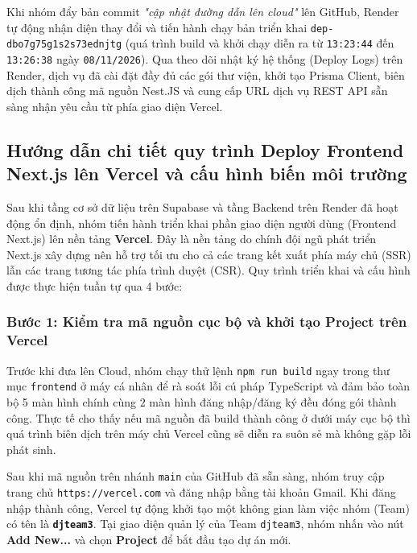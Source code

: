 Khi nhóm đẩy bản commit \textit{"cập nhật đường dẫn lên cloud"} lên GitHub, Render tự động nhận diện thay đổi và tiến hành chạy bản triển khai \texttt{dep-dbo7g75g1s2s73ednjtg} (quá trình build và khởi chạy diễn ra từ \texttt{13:23:44} đến \texttt{13:26:38} ngày \texttt{08/11/2026}). Qua theo dõi nhật ký hệ thống (Deploy Logs) trên Render, dịch vụ đã cài đặt đầy đủ các gói thư viện, khởi tạo Prisma Client, biên dịch thành công mã nguồn Nest.JS và cung cấp URL dịch vụ REST API sẵn sàng nhận yêu cầu từ phía giao diện Vercel.

\subsection{Hướng dẫn chi tiết quy trình Deploy Frontend Next.js lên Vercel và cấu hình biến môi trường}

Sau khi tầng cơ sở dữ liệu trên Supabase và tầng Backend trên Render đã hoạt động ổn định, nhóm tiến hành triển khai phần giao diện người dùng (Frontend Next.js) lên nền tảng \textbf{Vercel}. Đây là nền tảng do chính đội ngũ phát triển Next.js xây dựng nên hỗ trợ tối ưu cho cả các trang kết xuất phía máy chủ (SSR) lẫn các trang tương tác phía trình duyệt (CSR). Quy trình triển khai và cấu hình được thực hiện tuần tự qua 4 bước:

\subsubsection{Bước 1: Kiểm tra mã nguồn cục bộ và khởi tạo Project trên Vercel}
Trước khi đưa lên Cloud, nhóm chạy thử lệnh \texttt{npm run build} ngay trong thư mục \texttt{frontend} ở máy cá nhân để rà soát lỗi cú pháp TypeScript và đảm bảo toàn bộ 5 màn hình chính cùng 2 màn hình đăng nhập/đăng ký đều đóng gói thành công. Thực tế cho thấy nếu mã nguồn đã build thành công ở dưới máy cục bộ thì quá trình biên dịch trên máy chủ Vercel cũng sẽ diễn ra suôn sẻ mà không gặp lỗi phát sinh.

Sau khi mã nguồn trên nhánh \texttt{main} của GitHub đã sẵn sàng, nhóm truy cập trang chủ \texttt{https://vercel.com} và đăng nhập bằng tài khoản Gmail. Khi đăng nhập thành công, Vercel tự động khởi tạo một không gian làm việc nhóm (Team) có tên là \textbf{\texttt{djteam3}}. Tại giao diện quản lý của Team \texttt{djteam3}, nhóm nhấn vào nút \textbf{Add New...} và chọn \textbf{Project} để bắt đầu tạo dự án mới.

